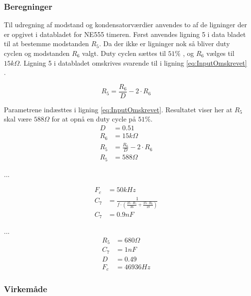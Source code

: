 \subsubsection{Beregninger}
Til udregning af modstand og kondensatorværdier anvendes to af de ligninger der er opgivet i databladet for NE555 timeren. Først anvendes ligning 5 i data bladet til at bestemme modstanden $R_5$. Da der ikke er ligninger nok så bliver duty cyclen og modstanden $R_6$ valgt. Duty cyclen sættes til $51 \% $ , og $R_6$ vælges til $15k \Omega $. Ligning 5 i databladet omskrives svarende til i ligning \ref{eq:InputOmskrevet} .

\begin{equation}
\label{eq:InputOmskrevet}
R_5 = \frac{R_6}{D} - 2 \cdot R_6
\end{equation}

Parametrene indæsttes i ligning \ref{eq:InputOmskrevet}.
Resultatet viser her at $R_5$ skal være $588 \Omega $ for at opnå en duty cycle på $51 \% $.
\begin{equation}
\label{eq:InputsModstand}
\begin{split}
D & = 0.51\\
R_6 & = 15k \Omega \\
R_5 & = \frac{R_6}{D} - 2 \cdot R_6 \\
R_5 & = 588 \Omega 
\end{split}
\end{equation}

... 

\begin{equation}
\label{eq:TriggerKondensator}
\begin{split}
F_c & = 50kHz \\
C_7 & = \frac{1}{f \cdot \left( \frac{25 \cdot R_5 }{36} + \frac{25 \cdot R_6}{18} \right) }\\
C_7 & = 0.9nF
\end{split}
\end{equation}

...
\begin{equation}
\label{eq:TimerTilnaermedeVaerdier}
\begin{split}
R_5 & = 680 \Omega \\
C_7 & = 1nF \\
D & = 0.49 \\
F_c & = 46936Hz
\end{split}
\end{equation}

\subsubsection{Virkemåde}

